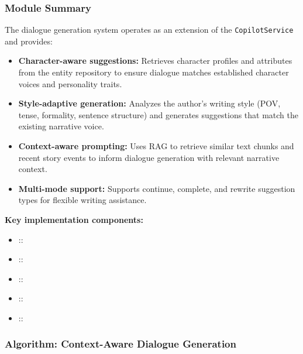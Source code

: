 \subsubsection{Module Summary}

The dialogue generation system operates as an extension of the \texttt{CopilotService} and provides:

\begin{itemize}
    \item \textbf{Character-aware suggestions:} Retrieves character profiles and attributes from the entity repository to ensure dialogue matches established character voices and personality traits.
    \item \textbf{Style-adaptive generation:} Analyzes the author's writing style (POV, tense, formality, sentence structure) and generates suggestions that match the existing narrative voice.
    \item \textbf{Context-aware prompting:} Uses RAG to retrieve similar text chunks and recent story events to inform dialogue generation with relevant narrative context.
    \item \textbf{Multi-mode support:} Supports continue, complete, and rewrite suggestion types for flexible writing assistance.
\end{itemize}

\textbf{Key implementation components:}
{\small
\begin{itemize}
    \item \texttt{} :: \texttt{}
    \item \texttt{} :: \texttt{}
    \item \texttt{} :: \texttt{}
    \item \texttt{} :: \texttt{}
    \item \texttt{} :: \texttt{}
\end{itemize}
}

\subsubsection{Algorithm: Context-Aware Dialogue Generation}

